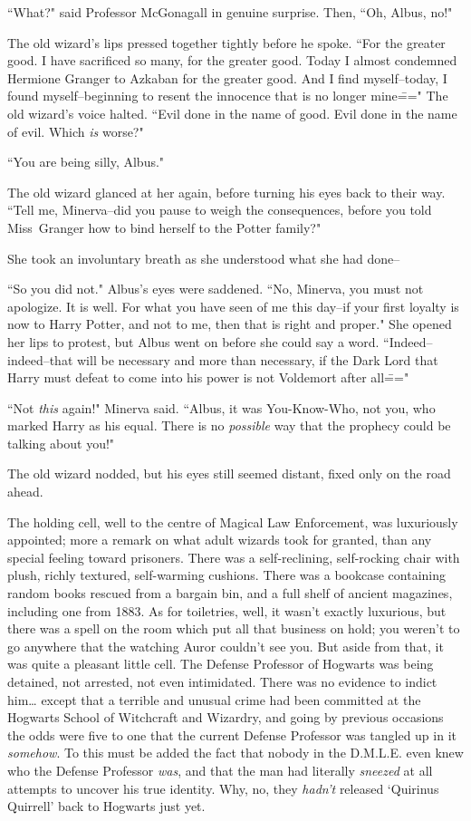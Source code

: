 ``What?" said Professor McGonagall in genuine surprise. Then, ``Oh, Albus, no!"

The old wizard's lips pressed together tightly before he spoke. ``For the greater good. I have sacrificed so many, for the greater good. Today I almost condemned Hermione Granger to Azkaban for the greater good. And I find myself\---today, I found myself\---beginning to resent the innocence that is no longer mine\===" The old wizard's voice halted. ``Evil done in the name of good. Evil done in the name of evil. Which \emph{is} worse?"

``You are being silly, Albus."

The old wizard glanced at her again, before turning his eyes back to their way. ``Tell me, Minerva\---did you pause to weigh the consequences, before you told Miss~Granger how to bind herself to the Potter family?"

She took an involuntary breath as she understood what she had done\---

``So you did not." Albus's eyes were saddened. ``No, Minerva, you must not apologize. It is well. For what you have seen of me this day\---if your first loyalty is now to Harry Potter, and not to me, then that is right and proper." She opened her lips to protest, but Albus went on before she could say a word. ``Indeed\---indeed\---that will be necessary and more than necessary, if the Dark Lord that Harry must defeat to come into his power is not Voldemort after all\==="

``Not \emph{this} again!" Minerva said. ``Albus, it was You-Know-Who, not you, who marked Harry as his equal. There is no \emph{possible} way that the prophecy could be talking about you!"

The old wizard nodded, but his eyes still seemed distant, fixed only on the road ahead.

\later

The holding cell, well to the centre of Magical Law Enforcement, was luxuriously appointed; more a remark on what adult wizards took for granted, than any special feeling toward prisoners. There was a self-reclining, self-rocking chair with plush, richly textured, self-warming cushions. There was a bookcase containing random books rescued from a bargain bin, and a full shelf of ancient magazines, including one from 1883. As for toiletries, well, it wasn't exactly luxurious, but there was a spell on the room which put all that business on hold; you weren't to go anywhere that the watching Auror couldn't see you. But aside from that, it was quite a pleasant little cell. The Defense Professor of Hogwarts was being detained, not arrested, not even intimidated. There was no evidence to indict him{\ldots} except that a terrible and unusual crime had been committed at the Hogwarts School of Witchcraft and Wizardry, and going by previous occasions the odds were five to one that the current Defense Professor was tangled up in it \emph{somehow}. To this must be added the fact that nobody in the D.M.L.E. even knew who the Defense Professor \emph{was}, and that the man had literally \emph{sneezed} at all attempts to uncover his true identity. Why, no, they \emph{hadn't} released `Quirinus Quirrell' back to Hogwarts just yet.

